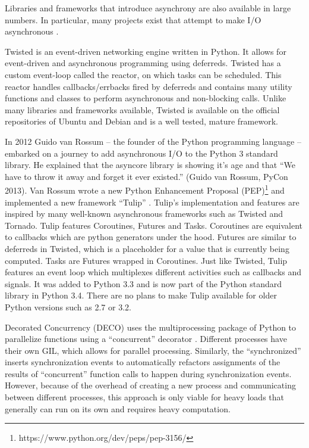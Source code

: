 Libraries and frameworks that introduce asynchrony are also available in large numbers.
In particular, many projects exist that attempt to make I/O asynchronous \cite{asyncio2016python}.

Twisted is an event-driven networking engine written in Python.
It allows for event-driven and asynchronous programming using deferreds.
Twisted has a custom event-loop called the reactor, on which tasks can be scheduled.
This reactor handles callbacks/errbacks fired by deferreds and contains many utility functions and classes to perform asynchronous and non-blocking calls.
Unlike many libraries and frameworks available, Twisted is available on the official repositories of Ubuntu and Debian and is a well tested, mature framework.

In 2012 Guido van Rossum -- the founder of the Python programming language -- embarked on a journey to add asynchronous I/O to the Python 3 standard library.
He explained that the asyncore library is showing it's age and that \enquote{We have to throw it away and forget it ever existed.} (Guido van Rossum, PyCon 2013).
Van Rossum wrote a new Python Enhancement Proposal (PEP)\footnote{https://www.python.org/dev/peps/pep-3156/} and implemented a new framework \enquote{Tulip} \cite{edge2013pycon}.
Tulip's implementation and features are inspired by many well-known asynchronous frameworks such as Twisted and Tornado.
Tulip features Coroutines, Futures and Tasks.
Coroutines are equivalent to callbacks which are python generators under the hood.
Futures are similar to deferreds in Twisted, which is a placeholder for a value that is currently being computed.
Tasks are Futures wrapped in Coroutines.
Just like Twisted, Tulip features an event loop which multiplexes different activities such as callbacks and signals. 
It was added to Python 3.3 and is now part of the Python standard library in Python 3.4.
There are no plans to make Tulip available for older Python versions such as 2.7 or 3.2.

Decorated Concurrency (DECO) uses the multiprocessing package of Python to parallelize functions using a ``concurrent'' decorator \cite{sherman2016deco}.
Different processes have their own GIL, which allows for parallel processing.
Similarly, the ``synchronized''  inserts synchronization events to automatically refactors assignments of the results of ``concurrent'' function calls to happen during synchronization events.
However, because of the overhead of creating a new process and communicating between different processes, this approach is only viable for heavy loads that generally can run on its own and requires heavy computation.


